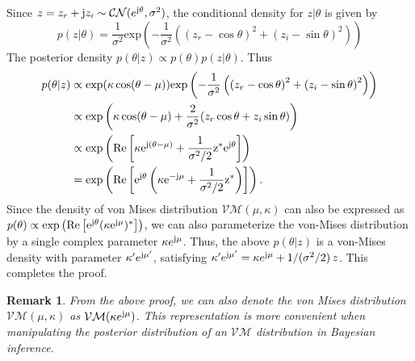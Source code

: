 \documentclass[12pt,draftclsnofoot,journal,onecolumn]{IEEEtran}
\newtheorem{remark}{\bf Remark}
\theoremstyle{nonumberplain}
\def \exp {\text{exp}}
\def \CN {\mathcal{CN}}
\def \VM {\mathcal{VM}}
\def \re {\rm Re}
\begin{document}
    \begin{IEEEproof}
        Since $z=z_r + {\rm j} z_i \sim \CN(e^{{\rm j} \theta}, \sigma^2)$, the conditional density for $z|\theta$ is given by 
        \begin{equation}
            p(z|\theta) = \frac{1}{\sigma^2}\exp\left(-\frac{1}{\sigma^2}\left(\left(z_r - \cos\theta\right)^2 + \left(z_i - \sin\theta\right)^2\right)\right)
        \end{equation}
        The posterior density $p(\theta | z) \propto p(\theta)p(z|\theta)$. Thus
        \begin{equation}
            \begin{aligned}
                p(\theta|z) & \propto \exp(\kappa \cos(\theta - \mu))\exp\left(-\frac{1}{\sigma^2}\left(\left(z_r - \cos\theta\right)^2 + \left(z_i - \sin\theta\right)^2\right)\right) \\
                & \propto \exp\left( \kappa \cos(\theta - \mu) + \frac{2}{\sigma^2}(z_r \cos\theta + z_i\sin\theta) \right) \\
                & \propto \exp\left( \re\left[ \kappa e^{{\rm j} (\theta - \mu)} + \frac{1}{\sigma^2/2}z^{*} e^{{\rm j} \theta} \right] \right) \\
                & = \exp\left( \re\left[ e^{{\rm j} \theta}\left(\kappa e^{-{\rm j}\mu} + \frac{1}{\sigma^2/2} z^*\right)\right] \right).
            \end{aligned}
        \end{equation}
        Since the density of von Mises distribution $\VM(\mu, \kappa)$ can also be expressed as $p(\theta) \propto \exp\left( \re\left[ e^{{\rm j} \theta}(\kappa e^{{\rm j} \mu})^* \right] \right)$, we can also parameterize the von-Mises distribution by a single complex parameter $\kappa e^{{\rm j}\mu}$. Thus, the above $p(\theta|z)$ is a von-Mises density with parameter $\kappa'e^{{\rm j}\mu'}$, satisfying $\kappa' e^{{\rm j}\mu'} = \kappa e^{{\rm j}\mu} + 1/(\sigma^2/2)\,z$. This completes the proof.
    \end{IEEEproof}
    \begin{remark}
        From the above proof, we can also denote the von Mises distribution $\VM(\mu, \kappa)$ as $\VM(\kappa e^{{\rm j}\mu})$. This representation is more convenient when manipulating the posterior distribution of an $\VM$ distribution in Bayesian inference.
    \end{remark}
\end{document}

